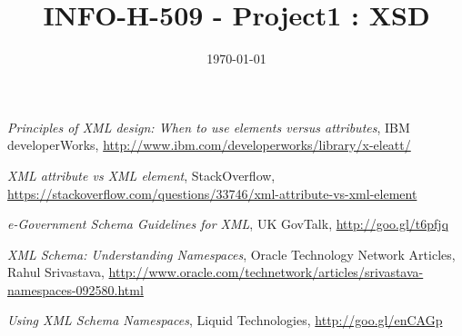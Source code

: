 \documentclass[a4paper, 11pt]{article}
\title{
	\textbf{INFO-H-509 - Project1 : XSD}\\
}
\date{\today}
\begin{document}
\maketitle
\newpage





\begin{thebibliography}{5}
 \emph{Principles of XML design: When to use elements versus attributes}, IBM developerWorks, \href{http://www.ibm.com/developerworks/library/x-eleatt/}{http://www.ibm.com/developerworks/library/x-eleatt/}

 \emph{XML attribute vs XML element}, StackOverflow, \href{https://stackoverflow.com/questions/33746/xml-attribute-vs-xml-element}{https://stackoverflow.com/questions/33746/xml-attribute-vs-xml-element}

 \emph{e-Government Schema Guidelines for XML}, UK GovTalk, \href{http://goo.gl/t6pfjq}{http://goo.gl/t6pfjq}

 \emph{XML Schema: Understanding Namespaces}, Oracle Technology Network Articles, Rahul Srivastava, \href{http://www.oracle.com/technetwork/articles/srivastava-namespaces-092580.html}{http://www.oracle.com/technetwork/articles/srivastava-namespaces-092580.html}

 \emph{Using XML Schema Namespaces}, Liquid Technologies, \href{http://goo.gl/enCAGp}{http://goo.gl/enCAGp}

\end{thebibliography}
\end{document}
